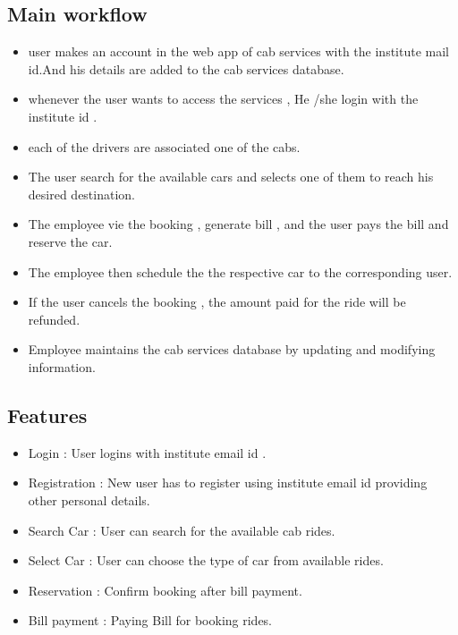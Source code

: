 \documentclass[conference]{IEEEtran}
\begin{document}
\subsection{Main workflow}
\begin{itemize}
\item user makes an account in the web app of cab services with the institute mail id.And his details are added to the cab services database.

\item whenever the user wants to access the services , He /she login with the institute id .
\item each of the drivers are associated one of the cabs.
\item The user search for the available cars and selects one of them to reach his desired destination.
\item The employee vie the booking ,  generate bill , and the user pays the bill and reserve the car.
\item The employee then schedule the the respective car to the corresponding user.
\item If the user cancels the booking , the amount paid for the ride will be refunded.
\item Employee maintains the cab services database by updating and modifying information.
\end{itemize}

\subsection{Features}
\begin{itemize}
\item Login : User logins with institute email id .
\item Registration : New user has to register using institute email id providing other personal details.
\item Search Car : User can search for the available cab rides.
\item Select Car : User can choose the type of car from available rides.
\item Reservation : Confirm booking after bill payment.
\item Bill payment : Paying Bill for booking rides.
\end{itemize}
\end{document}
